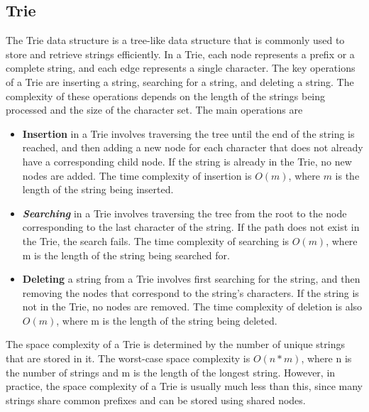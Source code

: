 \documentclass[10pt,a4paper]{report}
\begin{document}
\subsection{Trie}\label{sec:4-trie}
The Trie data structure is a tree-like data structure that is commonly used to store and retrieve strings efficiently. In a Trie, each node represents a prefix or a complete string, and each edge represents a single character.
The key operations of a Trie are inserting a string, searching for a string, and deleting a string. The complexity of these operations depends on the length of the strings being processed and the size of the character set. The main operations are
\begin{itemize}
	\item \textbf{Insertion} in a Trie involves traversing the tree until the end of the string is reached, and then adding a new node for each character that does not already have a corresponding child node. If the string is already in the Trie, no new nodes are added. The time complexity of insertion is $O(m)$, where $m$ is the length of the string being inserted.
	\item \textit{\textbf{Searching}} in a Trie involves traversing the tree from the root to the node corresponding to the last character of the string. If the path does not exist in the Trie, the search fails. The time complexity of searching is $O(m)$, where m is the length of the string being searched for.
	\item \textbf{Deleting} a string from a Trie involves first searching for the string, and then removing the nodes that correspond to the string's characters. If the string is not in the Trie, no nodes are removed. The time complexity of deletion is also $O(m)$, where m is the length of the string being deleted.
\end{itemize}

The space complexity of a Trie is determined by the number of unique strings that are stored in it. The worst-case space complexity is $O(n*m)$, where n is the number of strings and m is the length of the longest string. However, in practice, the space complexity of a Trie is usually much less than this, since many strings share common prefixes and can be stored using shared nodes.
\end{document}

